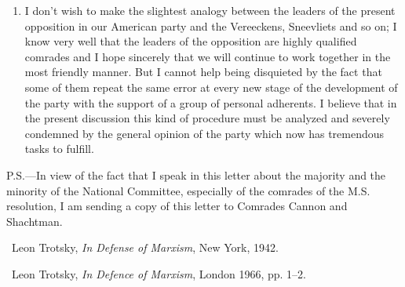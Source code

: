 \begin{enumerate}
  \item I don’t wish to make the slightest analogy between the leaders of the present opposition in our American party and the Vereeckens, Sneevliets and so on; I know very well that the leaders of the opposition are highly qualified comrades and I hope sincerely that we will continue to work together in the most friendly manner. But I cannot help being disquieted by the fact that some of them repeat the same error at every new stage of the development of the party with the support of a group of personal adherents. I believe that in the present discussion this kind of procedure must be analyzed and severely condemned by the general opinion of the party which now has tremendous tasks to fulfill.
	
\end{enumerate}

\newpage


\begin{postscriptum}
  P.S.---In view of the fact that I speak in this letter about the majority and the minority of the National Committee, especially of the comrades of the M.S. resolution, I am sending a copy of this letter to Comrades Cannon and Shachtman.
\end{postscriptum}

\begin{letterinfo}
  \firstpublished\ Leon Trotsky, \emph{In Defense of Marxism}, New York, 1942.

  \checkedagainst\ Leon Trotsky, \emph{In Defence of Marxism}, London 1966, pp. 1--2.

  \footnoteslatter
\end{letterinfo}